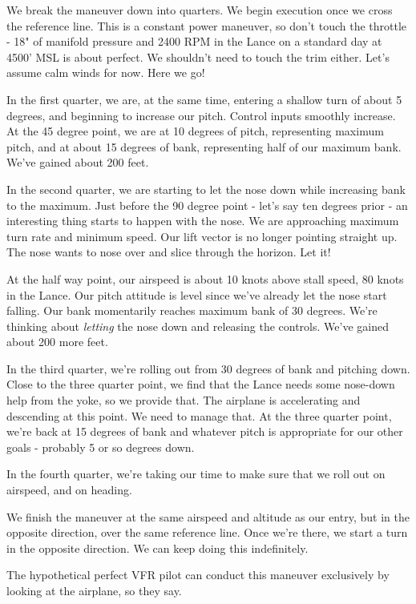We break the maneuver down into quarters. We begin execution once we cross the reference line. This is a constant power maneuver, so don't touch the throttle - 18" of manifold pressure and 2400 RPM in the Lance on a standard day at 4500' MSL is about perfect. We shouldn't need to touch the trim either. Let's assume calm winds for now. Here we go!

In the first quarter, we are, at the same time, entering a shallow turn of about 5 degrees, and beginning to increase our pitch. Control inputs smoothly increase. At the 45 degree point, we are at 10 degrees of pitch, representing maximum pitch, and at about 15 degrees of bank, representing half of our maximum bank. We've gained about 200 feet.

In the second quarter, we are starting to let the nose down while increasing bank to the maximum. Just before the 90 degree point - let's say ten degrees prior - an interesting thing starts to happen with the nose. We are approaching maximum turn rate and minimum speed. Our lift vector is no longer pointing straight up. The nose wants to nose over and slice through the horizon. Let it!

At the half way point, our airspeed is about 10 knots above stall speed, 80 knots in the Lance. Our pitch attitude is level since we've already let the nose start falling. Our bank momentarily reaches maximum bank of 30 degrees. We're thinking about \emph{letting} the nose down and releasing the controls. We've gained about 200 more feet.

In the third quarter, we're rolling out from 30 degrees of bank and pitching down. Close to the three quarter point, we find that the Lance needs some nose-down help from the yoke, so we provide that. The airplane is accelerating and descending at this point. We need to manage that. At the three quarter point, we're back at 15 degrees of bank and whatever pitch is appropriate for our other goals - probably 5 or so degrees down.

In the fourth quarter, we're taking our time to make sure that we roll out on airspeed, and on heading.

We finish the maneuver at the same airspeed and altitude as our entry, but in the opposite direction, over the same reference line. Once we're there, we start a turn in the opposite direction. We can keep doing this indefinitely.

The hypothetical perfect VFR pilot can conduct this maneuver exclusively by looking at the airplane, so they say.

